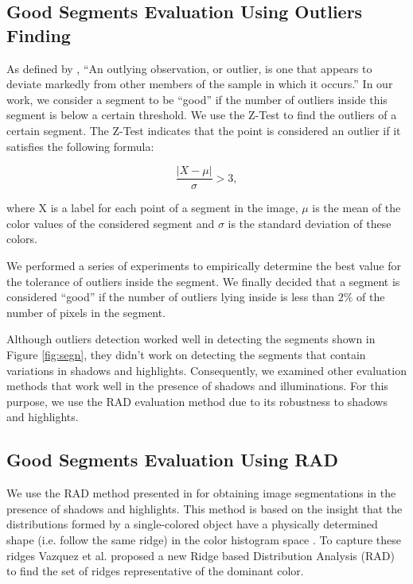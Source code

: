 \documentclass[10pt,twocolumn,letterpaper]{article}
\begin{document}
\subsection{Good Segments Evaluation Using Outliers Finding}

As defined by \cite{grubbs-1969}, ``An outlying observation, or outlier, is one
that appears to deviate markedly from other members of the sample in which it
occurs.'' In our work, we consider a segment to be ``good'' if the number of outliers inside this
segment is below a certain threshold. We use the Z-Test to find the outliers of a certain segment. The Z-Test
indicates that the point is considered an outlier if it satisfies the following
formula:

\begin{equation}
\frac{|X - \mu|}{\sigma} > 3,
\end{equation}

where X is a label for each point of a segment in the image, $\mu$ is the mean of the color
values of the considered segment and $\sigma$ is the standard deviation of these colors.

We performed a series of experiments to empirically determine the best value
for the tolerance of outliers inside the segment. We finally decided that a
segment is considered ``good'' if the number of outliers lying inside is less
than $2\%$ of the number of pixels in the segment.

Although outliers detection worked well in detecting the segments shown in Figure
\ref{fig:segn}, they didn't work on detecting the segments that contain variations
in shadows and highlights. Consequently, we examined other evaluation methods
that work well in the presence of shadows and illuminations. For this purpose, we use the
RAD evaluation method due to its robustness to shadows and highlights.

\subsection{Good Segments Evaluation Using RAD}

We use the RAD method presented in \cite{1478239} for obtaining image
segmentations in the presence of shadows and highlights. This method is based on
the insight that the distributions formed by a single-colored object have a
physically determined shape (i.e. follow the same ridge) in the color histogram space \cite{Sha85}. 
To capture these ridges Vazquez et al. \cite{1478239} proposed a new Ridge based
Distribution Analysis (RAD) to find the set of ridges representative of the dominant color.
\end{document}
